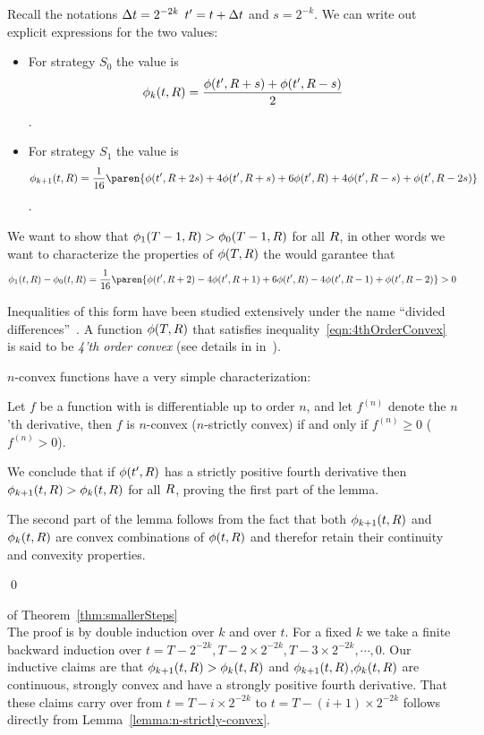 \documentclass{article}[12pt]
\begin{document}
\proof
Recall the notations $\Delta t = 2^{-2k}$ $t' = t+\Delta t$ and $s=2^{-k}$.
We can write out explicit expressions for the two values:
\begin{itemize}
\item For strategy $S_0$ the value is
  $$\phi_k(t, R) = \frac{\phi(t',R+s)+ \phi(t',R-s)}{2} $$.
\item For strategy $S_1$ the value is
  $$\pot_{k+1}(t, \R) = \frac{1}{16}
  \paren{\pot(t',\R+2s)+ 4\pot(t',\R+s)+ 6\pot(t',\R)+  4\pot(t',\R-s)+ \pot(t',\R-2s)}
  $$.
\end{itemize}

We want to show that $\phi_1(T-1,R) > \phi_0(T-1,R)$ for all $R$, in
other words we want to characterize the properties of $\phi(T,R)$ the
would garantee that
\begin{equation}\label{eqn:4thOrderConvex}
\pot_1(t,\R) - \pot_0(t,\R) =
\frac{1}{16}
\paren{ \pot(t',\R+2) - 4\pot(t',\R+1) +6\pot(t',\R) - 4\pot(t',\R-1) +\pot(t',\R-2)} > 0
\end{equation}

Inequalities of this form have been studied extensively under the name
``divided differences''~\cite{popoviciu1965certaines,butt2016generalization, de2005divided}.
A function $\phi(T,R)$ that satisfies
inequality~\ref{eqn:4thOrderConvex} is said to be {\em 4'th order convex}
(see details in in~\cite{butt2016generalization}).

$n$-convex functions have a very simple characterization:
\begin{theorem}
  Let $f$ be a  function with is differentiable up to order $n$, and
  let $f^{(n)}$ denote the $n$'th derivative, then $f$ is $n$-convex
  ($n$-strictly convex) if and only if $f^{(n)} \geq 0$ ($f^{(n)} > 0$).
\end{theorem}

We conclude that if $\phi(t',R)$ has a strictly positive fourth
derivative then $\phi_{k+1}(t,R) > \phi_{k}(t,R)$ for all $R$, proving
the first part of the lemma.

The second part of the lemma follows from the fact that
both $\phi_{k+1}(t,R)$ and $\phi_{k}(t,R)$ are convex combinations of
$\phi(t,R)$ and therefor retain their continuity and convexity properties.

\qed

\proof  of Theorem~\ref{thm:smallerSteps} \\
The proof is by double induction over $k$ and over $t$.
For a fixed $k$ we take a finite backward induction over
$t=T-2^{-2k},T-2 \times 2^{-2k},T-3 \times 2^{-2k},\cdots,0$.
Our inductive claims are that $\phi_{k+1}(t,R) > \phi_{k}(t,R)$ and
$\phi_{k+1}(t,R)$,$\phi_{k}(t,R)$ are continuous, strongly convex and
have a strongly positive fourth derivative. That these claims carry over
from $t=T-i \times 2^{-2k}$ to  $t=T-(i+1) \times 2^{-2k}$ follows
directly from Lemma~\ref{lemma:n-strictly-convex}.
\end{document}
